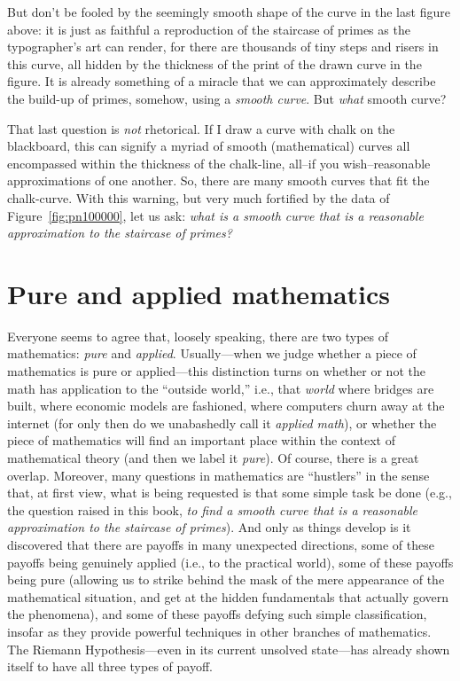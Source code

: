 \documentclass[11pt]{article}
\theoremstyle{plain}
\theoremstyle{definition}
\numberwithin{equation}{section}
\numberwithin{figure}{section}
\numberwithin{table}{section}
\begin{document}
But don't be fooled by the seemingly smooth shape of the curve in the
last figure above: it is just as faithful a reproduction of the
staircase of primes as the typographer's art can render, for there are
thousands of tiny steps and risers in this curve, all hidden by the
thickness of the print of the drawn curve in the figure.  It is
already something of a miracle that we can approximately describe the
build-up of primes, somehow, using a {\em smooth curve}.  But {\em
  what} smooth curve?


That last question is {\em not} rhetorical. If I draw a curve with
chalk on the blackboard, this can signify a myriad of smooth
(mathematical) curves all encompassed within the thickness of the
chalk-line, all--if you wish--reasonable approximations of one
another. So, there are many smooth curves that fit the chalk-curve.
With this warning, but very much fortified by the data of Figure~\ref{fig:pn100000},
let us ask: {\em what is a smooth curve that is a reasonable
  approximation to the staircase of primes?}

\section{ Pure and applied  mathematics  }     

Everyone seems to agree that, loosely speaking, there are two types of
mathematics: {\em pure} and {\em applied}. Usually---when we judge
whether a piece of mathematics is pure or applied---this distinction
turns on whether or not the math has application to the ``outside
world,'' i.e., that {\em world} where bridges are built, where economic
models are fashioned, where computers churn away at the internet (for
only then do we unabashedly call it {\em applied math}), or whether
the piece of mathematics will find an important place within the
context of mathematical theory (and then we label it {\em pure}).  Of
course, there is a great overlap. Moreover, many questions in
mathematics are ``hustlers'' in the sense that, at first view, what is
being requested is that some simple task be done (e.g., the question
raised in this book, {\em to find a smooth curve that is a reasonable
  approximation to the staircase of primes}).  And only as things
develop is it discovered that there are payoffs in many unexpected
directions, some of these payoffs being genuinely applied (i.e., to
the practical world), some of these payoffs being pure (allowing us
to strike behind the mask of the mere appearance of the mathematical
situation, and get at the hidden fundamentals that actually govern the
phenomena), and some of these payoffs defying such simple
classification, insofar as they provide powerful techniques in other
branches of mathematics.  The Riemann Hypothesis---even in its current
unsolved state---has already shown itself to have all three types of
payoff.
\end{document}
